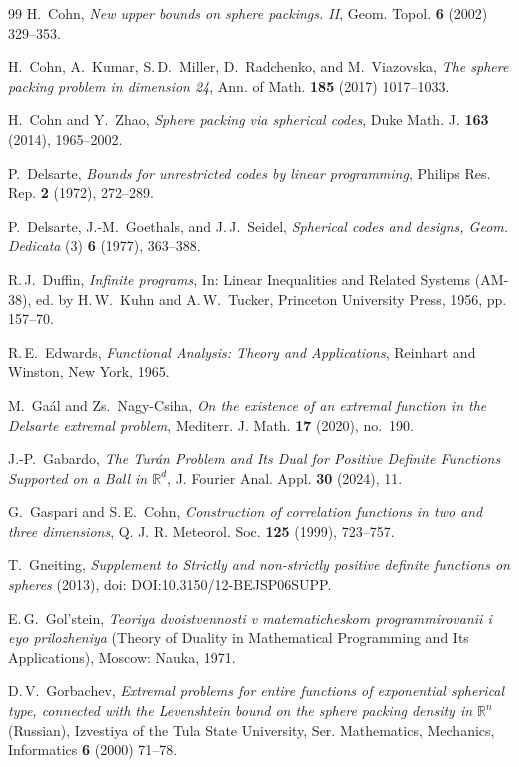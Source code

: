 \documentclass[[a4paper,english,12pt]{amsart}
\theoremstyle{plain}
\theoremstyle{remark}
\begin{document}
\begin{thebibliography}{99}
H.~Cohn, \emph{New upper bounds on sphere packings. II}, Geom. Topol. \textbf{6} (2002) 329--353.

H.~Cohn, A.~Kumar, S.\,D.~Miller, D.~Radchenko, and M.~Viazovska, \emph{The sphere packing problem in dimension 24}, Ann. of Math. \textbf{185} (2017) 1017--1033.

H.~Cohn and Y.~Zhao, \emph{Sphere packing via spherical codes}, Duke Math. J. {\bf 163} (2014), 1965--2002.

P.~Delsarte, \emph{Bounds for unrestricted codes by linear programming}, Philips Res. Rep. \textbf{2} (1972), 272--289.

P.~Delsarte, J.-M.~Goethals, and J.\,J.~Seidel, \emph{Spherical codes and designs, Geom. Dedicata} (3) \textbf{6} (1977), 363–388.

R.\,J.~Duffin, \emph{Infinite programs}, In: Linear Inequalities and Related Systems (AM-38), ed. by H.\,W.~Kuhn and A.\,W.~Tucker, Princeton University Press, 1956, pp. 157--70.

R.\,E.~Edwards, \emph{Functional Analysis: Theory and Applications}, Reinhart and Winston, New York, 1965.

M.~Ga\'al and Zs.~Nagy-Csiha,
\emph{On the existence of an extremal function in the Delsarte extremal problem},
Mediterr. J. Math. \textbf{17} (2020), no.~190.

J.-P.~Gabardo,
\emph{The Turán Problem and Its Dual for Positive Definite Functions Supported on a Ball in $\mathbb{R}^d$},
J. Fourier Anal. Appl. \textbf{30} (2024), 11.

G.~Gaspari and S.\,E.~Cohn, \emph{Construction of correlation functions in two and three dimensions}, Q. J. R. Meteorol. Soc. \textbf{125} (1999), 723--757.

T.~Gneiting, \emph{Supplement to Strictly and non-strictly positive definite functions on spheres} (2013), doi: DOI:10.3150/12-BEJSP06SUPP.

E.\,G.~Gol'stein, \emph{Teoriya dvoistvennosti v matematicheskom programmirovanii i eyo prilozheniya}
(Theory of Duality in Mathematical Programming and Its Applications), Moscow: Nauka, 1971.

D.\,V.~Gorbachev, \emph{Extremal problems for entire functions of exponential spherical type, connected with the Levenshtein bound on the sphere packing density in $\mathbb{R}^n$} (Russian), Izvestiya of the Tula State University, Ser. Mathematics, Mechanics, Informatics \textbf{6} (2000) 71--78.


\end{thebibliography}
\end{document}
